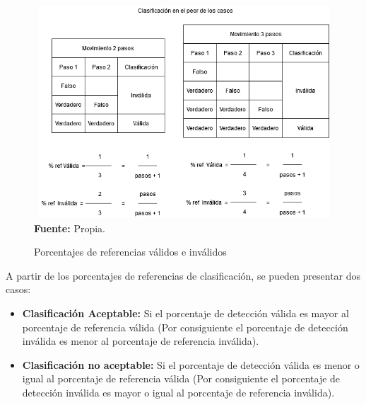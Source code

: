  \begin{figure}[H]
	\caption{Porcentajes de referencias v\'alidos e inv\'alidos }
	\label{fig:porcValido}
	\centering
	\includegraphics[width=430px,height=300px]{graphics/porceRef.png} \\
	\textbf{Fuente:} Propia.
\end{figure}
A partir de los porcentajes de referencias de clasificaci\'on, se pueden presentar dos casos:
\begin{itemize}
\item \textbf{Clasificaci\'on Aceptable:} Si el porcentaje de detecci\'on v\'alida es mayor al porcentaje de referencia v\'alida (Por consiguiente el porcentaje de detecci\'on inv\'alida es menor al porcentaje de referencia inv\'alida).
\item \textbf{Clasificaci\'on no aceptable:} Si el porcentaje de detecci\'on v\'alida es menor o igual al porcentaje de referencia v\'alida (Por consiguiente el porcentaje de detecci\'on inv\'alida es mayor o igual al porcentaje de referencia inv\'alida). 
\end{itemize}
